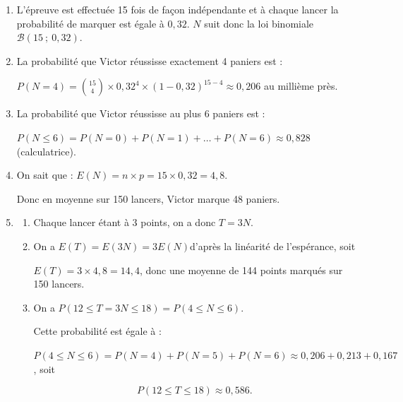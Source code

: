 \begin{enumerate}
\item %
L'épreuve est effectuée 15 fois de façon indépendante et à chaque lancer la probabilité de marquer est égale à $0,32$. $N$ suit donc la loi binomiale $\mathcal{B}(15~;~0,32)$.
\item %
La probabilité que Victor réussisse exactement 4 paniers est :

$P(N = 4) = \displaystyle \binom{15}{4}\times 0,32^4 \times (1 - 0,32)^{15-4} \approx 0,206$ au millième près.
\item %
La probabilité que Victor réussisse au plus 6 paniers est :

$P(N \leqslant 6) = P(N=0) + P(N = 1) + \ldots + P(N = 6) \approx 0,828$ (calculatrice).
\item %
On sait que : $E(N) = n \times p = 15 \times 0,32 = 4,8$.

Donc en moyenne sur 150 lancers, Victor marque 48 paniers.
\item %
	\begin{enumerate}
		\item %
Chaque lancer étant à 3 points, on a donc $T = 3N$.
		\item %
On a $E(T) = E (3N) = 3E(N)$\quad d'après la linéarité de l'espérance, soit

$E(T) = 3 \times 4,8 = 14,4$, donc une moyenne de 144 points marqués sur 150 lancers.
		\item %
On a $P(12 \leqslant T = 3N \leqslant 18) = P(4 \leqslant N \leqslant 6)$.

Cette probabilité est égale à :

$P(4 \leqslant N \leqslant 6) = P(N=4) + P(N=5) + P(N = 6) \approx 0,206 + 0,213 + 0,167$, soit

\[P(12 \leqslant T \leqslant 18) \approx 0,586.\]
	\end{enumerate}
\end{enumerate}

